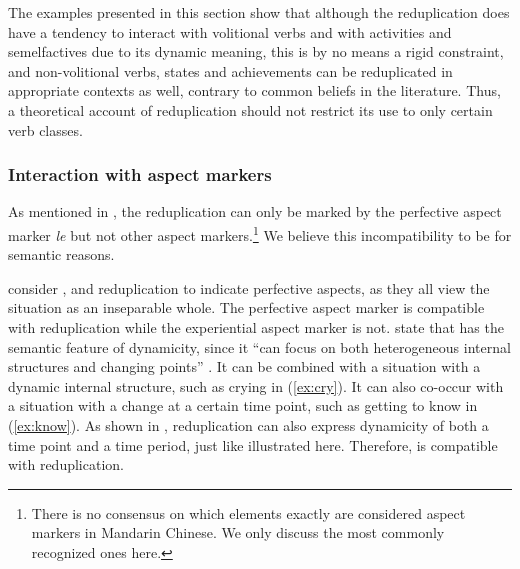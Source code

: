 
The examples presented in this section show that although the reduplication does have a tendency to interact with volitional verbs and with activities and semelfactives due to its dynamic meaning, 
this is by no means a rigid constraint, 
and non\hyp{}volitional verbs, states and achievements can be reduplicated in appropriate contexts as well,
 contrary to common beliefs in the literature.
Thus, a theoretical account of reduplication should not restrict its use to only certain verb classes.




\subsubsection{Interaction with aspect markers}\label{sec:aspM}

As mentioned in , the reduplication can only be marked by the perfective aspect marker \textit{le} but not other aspect markers.\footnote{
There is no consensus on which elements exactly are considered aspect markers in Mandarin Chinese. 
We only discuss the most commonly recognized ones here.
}
We believe this incompatibility to be for semantic reasons.

\citet[Ch. 4]{XiaoMcEnery2004} consider ,  and reduplication to indicate perfective aspects, as they all view the situation as an inseparable whole.
The perfective aspect marker  is compatible with reduplication while the experiential aspect marker  is not.
\citet[128--131]{XiaoMcEnery2004} state that  has the semantic feature of dynamicity, since it ``can focus on both heterogeneous internal structures and changing points'' \citep[129]{XiaoMcEnery2004}.
It can be combined with a situation with a dynamic internal structure, such as crying in (\ref{ex:cry}).
It can also co\hyp{}occur with a situation with a change at a certain time point, such as getting to know in (\ref{ex:know}).
As shown in , reduplication can also express
dynamicity of both a time point and a time period, 
just like  illustrated here. 
Therefore,  is compatible with reduplication.

